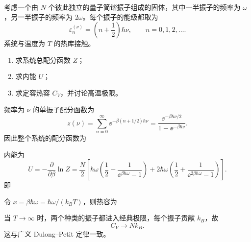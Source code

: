 \begin{question}
考虑一个由 $N$ 个彼此独立的量子简谐振子组成的固体，其中一半振子的频率为 $\omega$，另一半振子的频率为 $2\omega$。每个振子的能级都取为
\[
\varepsilon_n^{(\nu)}=\left(n+\frac12\right)\hbar\nu,
\qquad n=0,1,2,\dots.
\]
系统与温度为 $T$ 的热库接触。

\begin{enumerate}[label=(\arabic*),leftmargin=2.5em]
  \item 求系统总配分函数 $Z$；
  \item 求内能 $U$；
  \item 求定容热容 $C_V$，并讨论高温极限。
\end{enumerate}

\begin{solution}
频率为 $\nu$ 的单振子配分函数为
\[
z(\nu)=\sum_{n=0}^{\infty}\ee^{-\beta(n+1/2)\hbar\nu}
=\frac{\ee^{-\beta\hbar\nu/2}}{1-\ee^{-\beta\hbar\nu}}.
\]
因此整个系统的配分函数为

内能为
\[
U=-\frac{\partial}{\partial\beta}\ln Z
=\frac{N}{2}\left[\hbar\omega\left(\frac12+\frac{1}{\ee^{\beta\hbar\omega}-1}\right)+2\hbar\omega\left(\frac12+\frac{1}{\ee^{2\beta\hbar\omega}-1}\right)\right].
\]
即


令 $x=\beta\hbar\omega=\hbar\omega/(k_B T)$，则热容为

当 $T\to\infty$ 时，两个种类的振子都进入经典极限，每个振子贡献 $k_B$，故
\[
C_V\to Nk_B.
\]
这与广义 Dulong--Petit 定律一致。
\end{solution}
\end{question}


